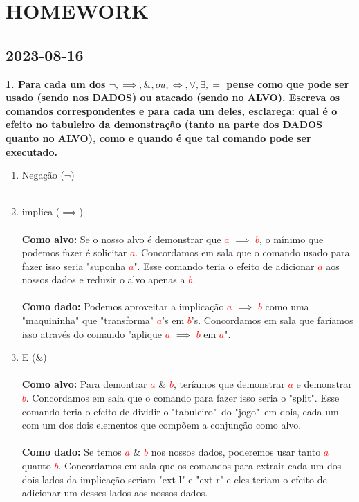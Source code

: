 \documentclass[a4paper, 12pt]{article}
\begin{document}
\section{HOMEWORK}
\subsection{2023-08-16}
\textbf{1. Para cada um dos $ \neg , \implies , \& , ou , \iff , \forall , \exists, =$ pense como que pode ser usado (sendo nos DADOS) ou atacado (sendo no ALVO). Escreva os comandos correspondentes e para cada um deles, esclareça: qual é o efeito no tabuleiro da demonstração (tanto na parte dos DADOS quanto no ALVO), como e quando é que tal comando pode ser executado.}
\begin{enumerate}[($i$)]
    \item Negação ($\neg$) \\ \\
    \item implica ($\implies$) \\ \\
    \textbf{Como alvo:} Se o nosso alvo é demonstrar que \textcolor{red}{$a$} $\implies$ \textcolor{red}{$b$}, o mínimo que podemos fazer é solicitar \textcolor{red}{$a$}. Concordamos em sala que o comando usado para fazer isso seria "suponha \textcolor{red}{$a$}". Esse comando teria o efeito de adicionar \textcolor{red}{$a$} aos nossos dados e reduzir o alvo apenas a \textcolor{red}{$b$}. \\ \\
    \textbf{Como dado:}
    Podemos aproveitar a implicação \textcolor{red}{$a$} $\implies$ \textcolor{red}{$b$} como uma "maquininha" que "transforma" \textcolor{red}{$a$}'s em \textcolor{red}{$b$}'s. Concordamos em sala que faríamos isso através do comando "aplique \textcolor{red}{$a$} $\implies$ \textcolor{red}{$b$} em \textcolor{red}{$a$}".
    \item E ($\&$) \\ \\
    \textbf{Como alvo:} 
    Para demontrar \textcolor{red}{$a$} $\&$ \textcolor{red}{$b$}, teríamos que demonstrar \textcolor{red}{$a$} e demonstrar \textcolor{red}{$b$}. Concordamos em sala que o comando para fazer isso seria o "split". Esse comando teria o efeito de dividir o "tabuleiro"~do "jogo"~em dois, cada um com um dos dois elementos que compõem a conjunção como alvo. \\ \\
    \textbf{Como dado:}
    Se temos \textcolor{red}{$a$} $\&$ \textcolor{red}{$b$} nos nossos dados, poderemos usar tanto \textcolor{red}{$a$} quanto \textcolor{red}{$b$}. Concordamos em sala que os comandos para extrair cada um dos dois lados da implicação seriam "ext-l" e "ext-r" e eles teriam o efeito de adicionar um desses lados aos nossos dados.

\end{enumerate}
\end{document}
